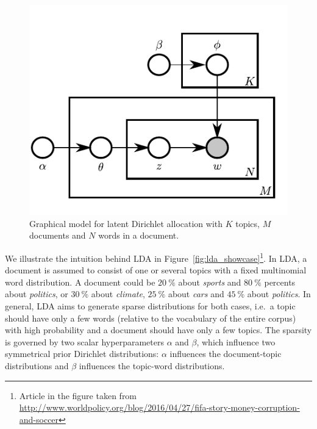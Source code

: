 \documentclass[
        a4paper,
        titlepage,
        twoside,
        parskip
        ]{scrbook}
\theoremstyle{break}
\begin{document}
\begin{figure}
       \centering
       \includegraphics{figures/lda.pdf}
       \caption{Graphical model for latent Dirichlet allocation with $K$ topics, $M$ documents and $N$ words in a document.}
       \label{fig:lda}
\end{figure}

We illustrate the intuition behind LDA in Figure~\ref{fig:lda_showcase}\footnote{Article in the figure taken from \\ \url{http://www.worldpolicy.org/blog/2016/04/27/fifa-story-money-corruption-and-soccer}}.
In LDA, a document is assumed to consist of one or several topics with a fixed multinomial word distribution.
A document could be $20~\%$ about \emph{sports} and $80~\%$ percents about \emph{politics}, or $30~\%$ about \emph{climate}, $25~\%$ about \emph{cars} and $45~\%$ about \emph{politics}.
In general, LDA aims to generate sparse distributions for both cases, i.e.\ a topic should have only a few words (relative to the vocabulary of the entire corpus) with high probability and a document should have only a few topics.
The sparsity is governed by two scalar hyperparameters $\alpha$ and $\beta$, which influence two symmetrical prior Dirichlet distributions:
$\alpha$ influences the document-topic distributions and $\beta$ influences the topic-word distributions.
\end{document}
